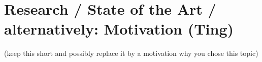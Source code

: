 \section{Research / State of the Art / alternatively: Motivation (Ting)}
(keep this short and possibly replace it by a motivation why you chose
this topic)
